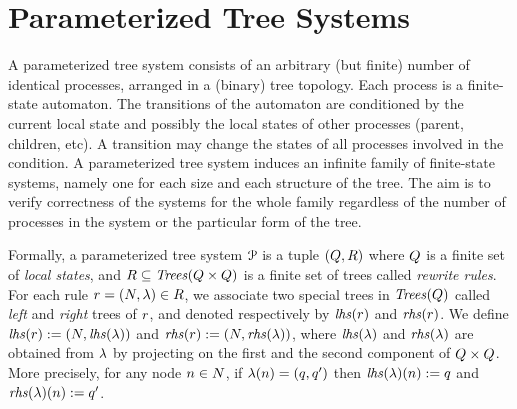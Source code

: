 \section{Parameterized Tree Systems}
\label{sec:parsys}
%

A parameterized tree system consists of an arbitrary (but finite) number of
identical processes, arranged in a (binary) tree topology.
%
Each process is a finite-state automaton.
%
The transitions of the automaton are conditioned by the current local state and 
possibly the local states of other processes (parent, children, etc).
%
A transition may change the states of all processes involved in the condition.
%
A parameterized tree system induces an infinite family of finite-state systems,
namely one for each size and each structure of the tree.
%
The aim is to verify correctness of the systems for the whole family
regardless of the number of processes in the system or the particular form
of the tree.
%

Formally, a parameterized tree system ${\EuScript P}$ is a tuple $\left(Q,R\right)$ where 
$Q$ is a finite set of \emph{local states}, and $R\subseteq{\it Trees}({Q
\times Q})$ is a finite set of trees called \emph{rewrite rules}.
%
For each rule $r=\left(N,\lambda\right)\in R$, we associate two special 
trees in ${\it Trees}({Q})$ called \emph{left} and \emph{right} trees of $r$, and 
denoted respectively by ${\it lhs}({r})$ and ${\it rhs}({r})$.
%
We define ${\it lhs}({r}):=\left(N,{\it lhs}({\lambda})\right)$ and ${\it rhs}({r}):=\left(
N,{\it rhs}({\lambda})\right)$, where ${\it lhs}({\lambda})$ and ${\it rhs}({\lambda})$ are obtained 
from $\lambda$ by projecting on the first and the second component of $Q\times Q$.
%
More precisely, for any node $n\in N$, if $\lambda(n)=(q,q')$ 
then ${\it lhs}({\lambda})(n):=q$ and  ${\it rhs}({\lambda})(n):=q'$. 
%

